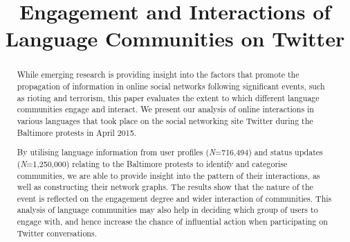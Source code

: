 \documentclass[conference]{IEEEtran}
\begin{document}
\title{Engagement and Interactions of Language Communities on Twitter}


\author{
\and
{}
\and
{}
}



\maketitle


\begin{abstract}
While emerging research is providing insight into the factors that
promote the propagation of information in online social networks
following significant events, such as rioting and terrorism, this
paper evaluates the extent to which different language communities
engage and interact. We present our analysis of online interactions in
various languages that took place on the social networking site
Twitter during the Baltimore protests in April 2015.

By utilising language information from user profiles
({\emph{N}}=716,494) and status updates ({\emph{N}}=1,250,000)
relating to the Baltimore protests to identify and categorise
communities, we are able to provide insight into the pattern of their
interactions, as well as constructing their network graphs. The
results show that the nature of the event is reflected on the
engagement degree and wider interaction of communities. This analysis
of language communities may also help in deciding which group of users
to engage with, and hence increase the chance of influential action
when participating on Twitter conversations.
\end{abstract}
\end{document}
